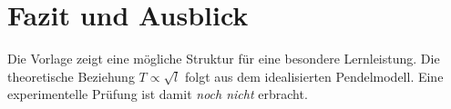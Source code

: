 \chapter{Fazit und Ausblick}
\label{ch:fazit}

Die Vorlage zeigt eine mögliche Struktur für eine besondere
Lernleistung. Die theoretische Beziehung \(T\propto\sqrt{l}\)
folgt aus dem idealisierten Pendelmodell. Eine experimentelle Prüfung
ist damit \emph{noch nicht} erbracht.

